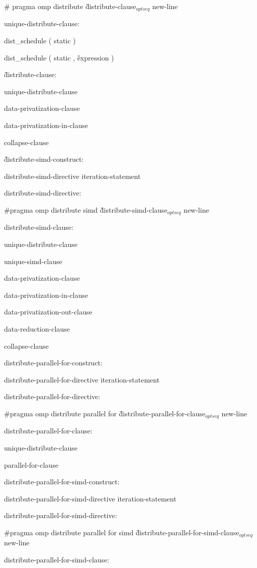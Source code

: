 {\C\I \# pragma omp distribute \G distribute-clause$_{optseq}$ new-line

unique-distribute-clause:

\C\I dist\_schedule ( static )

\C\I dist\_schedule ( static , \G expression \C )

\G distribute-clause:

\I unique-distribute-clause

\I data-privatization-clause

\I data-privatization-in-clause

\I collapse-clause

\G distribute-simd-construct:

\I distribute-simd-directive iteration-statement

distribute-simd-directive:

\C\I \#pragma omp distribute simd \G distribute-simd-clause$_{optseq}$ new-line

distribute-simd-clause:

\I unique-distribute-clause

\I unique-simd-clause

\I data-privatization-clause

\I data-privatization-in-clause

\I data-privatization-out-clause

\I data-reduction-clause

\I collapse-clause

distribute-parallel-for-construct:

\I distribute-parallel-for-directive iteration-statement

distribute-parallel-for-directive:

\C\I \#pragma omp distribute parallel for \G distribute-parallel-for-clause$_{optseq}$ new-line

distribute-parallel-for-clause:

\I unique-distribute-clause

\I parallel-for-clause

distribute-parallel-for-simd-construct:

\I distribute-parallel-for-simd-directive iteration-statement

distribute-parallel-for-simd-directive:

\C\I \#pragma omp distribute parallel for simd \G distribute-parallel-for-simd-clause$_{optseq}$ new-line

distribute-parallel-for-simd-clause:

}
